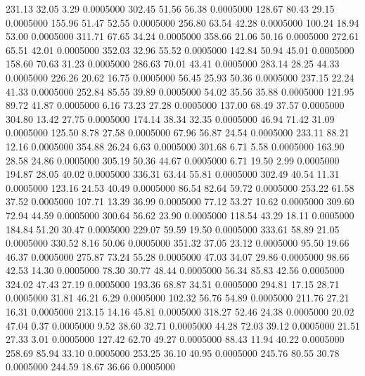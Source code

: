  231.13   32.05    3.29   0.0005000
 302.45   51.56   56.38   0.0005000
 128.67   80.43   29.15   0.0005000
 155.96   51.47   52.55   0.0005000
 256.80   63.54   42.28   0.0005000
 100.24   18.94   53.00   0.0005000
 311.71   67.65   34.24   0.0005000
 358.66   21.06   50.16   0.0005000
 272.61   65.51   42.01   0.0005000
 352.03   32.96   55.52   0.0005000
 142.84   50.94   45.01   0.0005000
 158.60   70.63   31.23   0.0005000
 286.63   70.01   43.41   0.0005000
 283.14   28.25   44.33   0.0005000
 226.26   20.62   16.75   0.0005000
  56.45   25.93   50.36   0.0005000
 237.15   22.24   41.33   0.0005000
 252.84   85.55   39.89   0.0005000
  54.02   35.56   35.88   0.0005000
 121.95   89.72   41.87   0.0005000
   6.16   73.23   27.28   0.0005000
 137.00   68.49   37.57   0.0005000
 304.80   13.42   27.75   0.0005000
 174.14   38.34   32.35   0.0005000
  46.94   71.42   31.09   0.0005000
 125.50    8.78   27.58   0.0005000
  67.96   56.87   24.54   0.0005000
 233.11   88.21   12.16   0.0005000
 354.88   26.24    6.63   0.0005000
 301.68    6.71    5.58   0.0005000
 163.90   28.58   24.86   0.0005000
 305.19   50.36   44.67   0.0005000
   6.71   19.50    2.99   0.0005000
 194.87   28.05   40.02   0.0005000
 336.31   63.44   55.81   0.0005000
 302.49   40.54   11.31   0.0005000
 123.16   24.53   40.49   0.0005000
  86.54   82.64   59.72   0.0005000
 253.22   61.58   37.52   0.0005000
 107.71   13.39   36.99   0.0005000
  77.12   53.27   10.62   0.0005000
 309.60   72.94   44.59   0.0005000
 300.64   56.62   23.90   0.0005000
 118.54   43.29   18.11   0.0005000
 184.84   51.20   30.47   0.0005000
 229.07   59.59   19.50   0.0005000
 333.61   58.89   21.05   0.0005000
 330.52    8.16   50.06   0.0005000
 351.32   37.05   23.12   0.0005000
  95.50   19.66   46.37   0.0005000
 275.87   73.24   55.28   0.0005000
  47.03   34.07   29.86   0.0005000
  98.66   42.53   14.30   0.0005000
  78.30   30.77   48.44   0.0005000
  56.34   85.83   42.56   0.0005000
 324.02   47.43   27.19   0.0005000
 193.36   68.87   34.51   0.0005000
 294.81   17.15   28.71   0.0005000
  31.81   46.21    6.29   0.0005000
 102.32   56.76   54.89   0.0005000
 211.76   27.21   16.31   0.0005000
 213.15   14.16   45.81   0.0005000
 318.27   52.46   24.38   0.0005000
  20.02   47.04    0.37   0.0005000
   9.52   38.60   32.71   0.0005000
  44.28   72.03   39.12   0.0005000
  21.51   27.33    3.01   0.0005000
 127.42   62.70   49.27   0.0005000
  88.43   11.94   40.22   0.0005000
 258.69   85.94   33.10   0.0005000
 253.25   36.10   40.95   0.0005000
 245.76   80.55   30.78   0.0005000
 244.59   18.67   36.66   0.0005000
